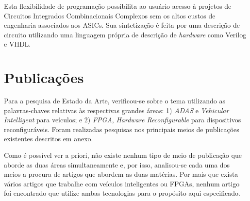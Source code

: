 \documentclass[12pt]{article}
\begin{document}
Esta flexibilidade de programação possibilita ao usuário acesso à projetos de Circuitos Integrados Combinacionais Complexos sem os altos custos de engenharia associados aos ASICs. Sua sintetização é feita por uma descrição de circuito utilizando uma linguagem própria de descrição de \textit{hardware} como Verilog e VHDL.






\section{Publicações}

Para a pesquisa de Estado da Arte, verificou-se sobre o tema utilizando as palavras-chaves relativas às respectivas grandes áreas: 1) \textit{ADAS} e \textit{Vehicular Intelligent} para veículos; e 2) \textit{FPGA}, \textit{Hardware Reconfigurable} para dispositivos reconfiguráveis. Foram realizadas pesquisas nos principais meios de publicações existentes descritos em anexo.

Como é possível ver a priori, não existe nenhum tipo de meio de publicação que aborde as duas áreas simultaneamente e, por isso, analisou-se cada uma dos meios a procura de artigos que abordem as duas matérias. Por mais que exista vários artigos que trabalhe com veículos inteligentes ou FPGAs, nenhum artigo foi encontrado que utilize ambas tecnologias para o propósito aqui especificado.
\end{document}
